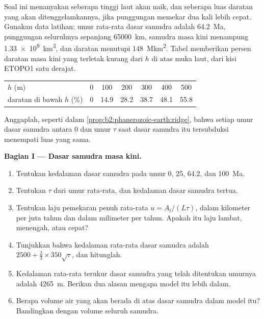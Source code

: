 \begin{problem}\label{pb:b2:phanerozoic-earth:1}
Soal ini menanyakan seberapa tinggi laut akan naik, dan seberapa luas daratan yang akan ditenggelamkannya, jika
punggungan memekar dua kali lebih cepat. Gunakan data latihan; umur rata-rata dasar samudra adalah
\qty{64.2}{Ma}, punggungan seluruhnya sepanjang \qty{65000}{km}, samudra masa kini menampung
\qty{1.33e9}{km^3}, dan daratan menutupi \qty{148}{\mega km^2}. Tabel memberikan persen daratan
masa kini yang terletak kurang dari $h$ di atas muka laut, dari kisi ETOPO1 satu derajat.
\begin{center}
\small
\begin{tabular}{lcccccc}
\hline
$h$ (\unit{m}) & 0 & 100 & 200 & 300 & 400 & 500 \\
daratan di bawah $h$ (\unit{\percent}) & 0 & 14.9 & 28.2 & 38.7 & 48.1 & 55.8 \\
\hline
\end{tabular}
\end{center}
Anggaplah, seperti dalam \cref{prop:b2:phanerozoic-earth:ridge}, bahwa setiap umur dasar samudra antara 0 dan
umur $\tau$ saat dasar samudra itu tersubduksi menempati luas yang sama.

\noindent\textbf{Bagian I --- Dasar samudra masa kini.}
\begin{enumerate}
  \item Tentukan kedalaman dasar samudra pada umur 0, 25, 64.2, dan \qty{100}{Ma}.
  \item Tentukan $\tau$ dari umur rata-rata, dan kedalaman dasar samudra tertua.
  \item Tentukan laju pemekaran penuh rata-rata $u = A_{\text{f}}/(L\tau)$, dalam kilometer per juta
        tahun dan dalam milimeter per tahun. Apakah itu laju lambat, menengah, atau cepat?
  \item Tunjukkan bahwa kedalaman rata-rata dasar samudra adalah $2500 + \tfrac23 \times 350\sqrt\tau$, dan
        hitunglah.
  \item Kedalaman rata-rata terukur dasar samudra yang telah ditentukan umurnya adalah \qty{4265}{m}. Berikan dua alasan mengapa
        model itu lebih dalam.
  \item Berapa volume air yang akan berada di atas dasar samudra dalam model itu? Bandingkan dengan volume
        seluruh samudra.
\end{enumerate}


\end{problem}
